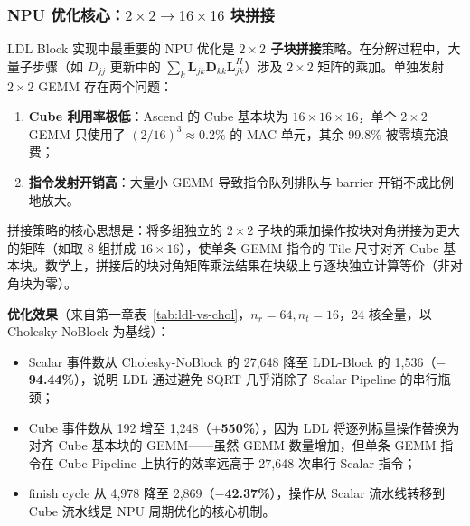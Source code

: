 \documentclass{CjC}
\begin{document}
    \subsubsection{NPU 优化核心：\texorpdfstring{$2\times2\rightarrow 16\times16$}{2x2
    to 16x16} 块拼接}

    LDL Block 实现中最重要的 NPU 优化是 \textbf{$2\times2$ 子块拼接}策略。在分解过程中，大量子步骤（如
    $D_{jj}$ 更新中的 $\sum_{k}\bm{L}_{jk}\bm{D}_{kk}\bm{L}_{jk}^{H}$）涉及
    $2\times2$ 矩阵的乘加。单独发射 $2\times2$ GEMM 存在两个问题：

    \begin{enumerate}
        \item \textbf{Cube 利用率极低}：Ascend 的 Cube 基本块为 $16\times16\times
            16$，单个 $2\times2$ GEMM 只使用了 $(2/16)^{3}\approx 0.2\%$ 的 MAC
            单元，其余 99.8\% 被零填充浪费；

        \item \textbf{指令发射开销高}：大量小 GEMM 导致指令队列排队与 barrier 开销不成比例地放大。
    \end{enumerate}

    拼接策略的核心思想是：将多组独立的 $2\times2$
    子块的乘加操作按块对角拼接为更大的矩阵（如取 8 组拼成 $16\times16$），使单条
    GEMM 指令的 Tile 尺寸对齐 Cube 基本块。数学上，拼接后的块对角矩阵乘法结果在块级上与逐块独立计算等价（非对角块为零）。

    \textbf{优化效果}（来自第一章表~\ref{tab:ldl-vs-chol}，$n_{r}=64,n_{t}=16$，24
    核全量，以 Cholesky-NoBlock 为基线）：
    \begin{itemize}
        \item Scalar 事件数从 Cholesky-NoBlock 的 27,648 降至 LDL-Block 的 1,536（\textbf{$-$94.44\%}），说明
            LDL 通过避免 SQRT 几乎消除了 Scalar Pipeline 的串行瓶颈；

        \item Cube 事件数从 192 增至 1,248（\textbf{$+$550\%}），因为 LDL
            将逐列标量操作替换为对齐 Cube 基本块的 GEMM——虽然 GEMM
            数量增加，但单条 GEMM 指令在 Cube Pipeline 上执行的效率远高于 27,648
            次串行 Scalar 指令；

        \item finish cycle 从 4,978 降至 2,869（\textbf{$-$42.37\%}），操作从
            Scalar 流水线转移到 Cube 流水线是 NPU 周期优化的核心机制。
    \end{itemize}
\end{document}
